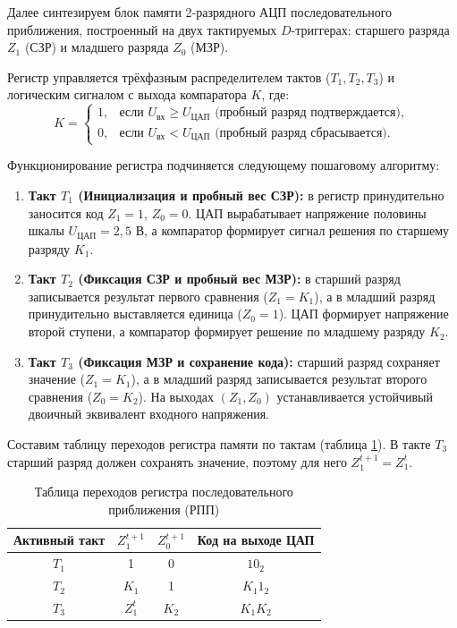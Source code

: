 \documentclass[14pt, a4paper]{extarticle}
\begin{document}
	Далее синтезируем блок памяти 2-разрядного АЦП последовательного приближения, построенный на двух тактируемых $D$-триггерах: старшего разряда $Z_1$ (СЗР) и младшего разряда $Z_0$ (МЗР).
	
	Регистр управляется трёхфазным распределителем тактов ($T_1, T_2, T_3$) и логическим сигналом с выхода компаратора $K$, где:
	\begin{equation*}
		K = \begin{cases} 
			1, & \text{если } U_{\text{вх}} \ge U_{\text{ЦАП}} \text{ (пробный разряд подтверждается)}, \\ 
			0, & \text{если } U_{\text{вх}} < U_{\text{ЦАП}} \text{ (пробный разряд сбрасывается)}. 
		\end{cases}
	\end{equation*}
	
	Функционирование регистра подчиняется следующему пошаговому алгоритму:
	\begin{enumerate}
		\item \textbf{Такт $T_1$ (Инициализация и пробный вес СЗР):} в регистр принудительно заносится код $Z_1 = 1$, $Z_0 = 0$. ЦАП вырабатывает напряжение половины шкалы $U_{\text{ЦАП}} = 2{,}5\text{ В}$, а компаратор формирует сигнал решения по старшему разряду $K_1$.
		\item \textbf{Такт $T_2$ (Фиксация СЗР и пробный вес МЗР):} в старший разряд записывается результат первого сравнения ($Z_1 = K_1$), а в младший разряд принудительно выставляется единица ($Z_0 = 1$). ЦАП формирует напряжение второй ступени, а компаратор формирует решение по младшему разряду $K_2$.
		\item \textbf{Такт $T_3$ (Фиксация МЗР и сохранение кода):} старший разряд сохраняет значение ($Z_1 = K_1$), а в младший разряд записывается результат второго сравнения ($Z_0 = K_2$). На выходах $(Z_1, Z_0)$ устанавливается устойчивый двоичный эквивалент входного напряжения.
	\end{enumerate}
	
	Составим таблицу переходов регистра памяти по тактам (таблица \ref{tab:sar_mem_trans}). В такте $T_3$ старший разряд должен сохранять значение, поэтому для него $Z_1^{t+1} = Z_1^t$.
	
	\begin{table}[H]
		\centering
		\begin{tabular}{|c|c|c|c|}
			\hline
			Активный такт & $Z_1^{t+1}$ & $Z_0^{t+1}$ & Код на выходе ЦАП \\ \hline
			$T_1$ & 1 & 0 & $10_2$ \\ \hline
			$T_2$ & $K_1$ & 1 & $K_1 1_2$ \\ \hline
			$T_3$ & $Z_1^t$ & $K_2$ & $K_1 K_2$ \\ \hline
		\end{tabular}
		\caption{Таблица переходов регистра последовательного приближения (РПП)}
		\label{tab:sar_mem_trans}
	\end{table}
	
\end{document}
